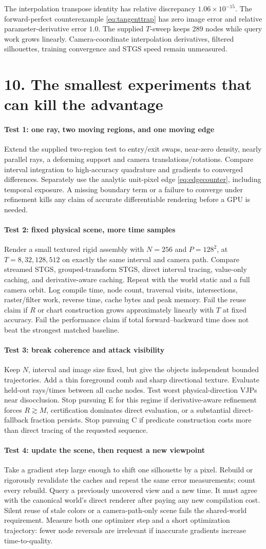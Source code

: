 \documentclass[11pt,letterpaper]{article}
\newcommand{\pagehead}[2]{\newpage\section*{#1}\vspace{-3pt}{\small\sffamily\color{ink}#2}\par\vspace{4pt}}
\newcommand{\mini}[1]{\paragraph{#1}}
\begin{document}
The interpolation transpose identity has relative discrepancy $1.06\times10^{-15}$. The forward-perfect counterexample \eqref{eq:tangenttrap} has zero image error and relative parameter-derivative error $1.0$. The supplied $T$-sweep keeps 289 nodes while query work grows linearly. Camera-coordinate interpolation derivatives, filtered silhouettes, training convergence and STGS speed remain unmeasured.

\pagehead{10. The smallest experiments that can kill the advantage}{FALSIFICATION / STOP EARLY WHEN A CLAIM FAILS}
\mini{Test 1: one ray, two moving regions, and one moving edge}
Extend the supplied two-region test to entry/exit swaps, near-zero density, nearly parallel rays, a deforming support and camera translations/rotations. Compare interval integration to high-accuracy quadrature and gradients to converged differences. Separately use the analytic unit-pixel edge \eqref{eq:edgecounter}, including temporal exposure. A missing boundary term or a failure to converge under refinement kills any claim of accurate differentiable rendering before a GPU is needed. 

\mini{Test 2: fixed physical scene, more time samples}
Render a small textured rigid assembly with $N=256$ and $P=128^2$, at $T=8,32,128,512$ on exactly the same interval and camera path. Compare streamed STGS, grouped-transform STGS, direct interval tracing, value-only caching, and derivative-aware caching. Repeat with the world static and a full camera orbit. Log compile time, node count, traversal visits, intersections, raster/filter work, reverse time, cache bytes and peak memory. Fail the reuse claim if $R$ or chart construction grows approximately linearly with $T$ at fixed accuracy. Fail the performance claim if total forward--backward time does not beat the strongest matched baseline. 

\mini{Test 3: break coherence and attack visibility}
Keep $N$, interval and image size fixed, but give the objects independent bounded trajectories. Add a thin foreground comb and sharp directional texture. Evaluate held-out rays/times between all cache nodes. Test worst physical-direction VJPs near disocclusion. Stop pursuing E for this regime if derivative-aware refinement forces $R\gtrsim M$, certification dominates direct evaluation, or a substantial direct-fallback fraction persists. Stop pursuing C if predicate construction costs more than direct tracing of the requested sequence. 

\mini{Test 4: update the scene, then request a new viewpoint}
Take a gradient step large enough to shift one silhouette by a pixel. Rebuild or rigorously revalidate the caches and repeat the same error measurements; count every rebuild. Query a previously uncovered view and a new time. It must agree with the canonical world's direct renderer after paying any new compilation cost. Silent reuse of stale colors or a camera-path-only scene fails the shared-world requirement. Measure both one optimizer step and a short optimization trajectory: fewer node reversals are irrelevant if inaccurate gradients increase time-to-quality.
\end{document}
